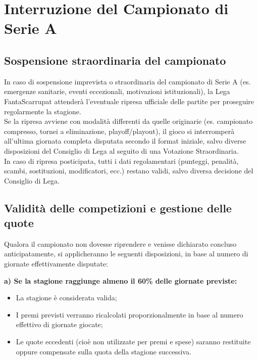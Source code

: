 \chapter{Interruzione del Campionato di Serie A}
\label{cap:interruzione-campionato}

\section{Sospensione straordinaria del campionato}
\label{art:8.1}

In caso di sospensione imprevista o straordinaria del campionato di Serie A (es. emergenze sanitarie, eventi eccezionali, motivazioni istituzionali), la Lega FantaScarrupat attenderà l'eventuale ripresa ufficiale delle partite per proseguire regolarmente la stagione.\\

Se la ripresa avviene con modalità differenti da quelle originarie (es. campionato compresso, tornei a eliminazione, playoff/playout), il gioco si interromperà all'ultima giornata completa disputata secondo il format iniziale, salvo diverse disposizioni del Consiglio di Lega al seguito di una Votazione Straordinaria.\\

In caso di ripresa posticipata, tutti i dati regolamentari (punteggi, penalità, scambi, sostituzioni, modificatori, ecc.) restano validi, salvo diversa decisione del Consiglio di Lega.

\section{Validità delle competizioni e gestione delle quote}
\label{art:8.2}

Qualora il campionato non dovesse riprendere e venisse dichiarato concluso anticipatamente, si applicheranno le seguenti disposizioni, in base al numero di giornate effettivamente disputate:

\noindent
\textbf{a) Se la stagione raggiunge almeno il 60\% delle giornate previste:}
\begin{itemize}
\item La stagione è considerata valida;
\item I premi previsti verranno ricalcolati proporzionalmente in base al numero effettivo di giornate giocate;
\item Le quote eccedenti (cioè non utilizzate per premi e spese) saranno restituite oppure compensate sulla quota della stagione successiva.
\end{itemize}


